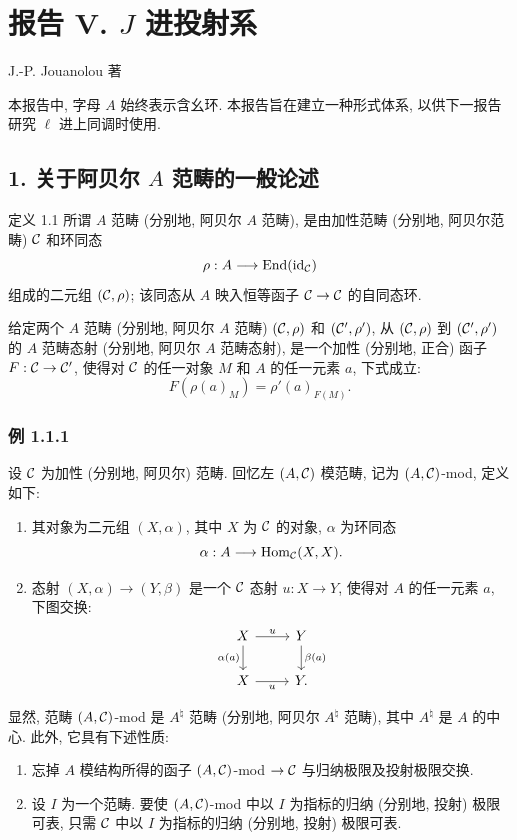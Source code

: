 
\section*{报告 V. $J$ 进投射系}
\begin{center}J.-P. Jouanolou 著\end{center}

本报告中, 字母 $A$ 始终表示含幺环. 本报告旨在建立一种形式体系, 以供下一报告研究 $\ell$ 进上同调时使用.

\subsection*{1. 关于阿贝尔 $A$ 范畴的一般论述}

\begin{statement}{定义 1.1}
所谓 $A$ 范畴 (分别地, 阿贝尔 $A$ 范畴), 是由加性范畴 (分别地, 阿贝尔范畴) $\mathcal C$ 和环同态
\[
\rho:A\longrightarrow \operatorname{End}(\operatorname{id}_{\mathcal C})
\]
组成的二元组 $(\mathcal C,\rho)$; 该同态从 $A$ 映入恒等函子 $\mathcal C\to\mathcal C$ 的自同态环.
\end{statement}

给定两个 $A$ 范畴 (分别地, 阿贝尔 $A$ 范畴) $(\mathcal C,\rho)$ 和 $(\mathcal C',\rho')$, 从 $(\mathcal C,\rho)$ 到 $(\mathcal C',\rho')$ 的 $A$ 范畴态射 (分别地, 阿贝尔 $A$ 范畴态射), 是一个加性 (分别地, 正合) 函子 $F:\mathcal C\to\mathcal C'$, 使得对 $\mathcal C$ 的任一对象 $M$ 和 $A$ 的任一元素 $a$, 下式成立:
\[
F(\rho(a)_M)=\rho'(a)_{F(M)}.
\]

\subsubsection*{例 1.1.1}
设 $\mathcal C$ 为加性 (分别地, 阿贝尔) 范畴. 回忆左 $(A,\mathcal C)$ 模范畴, 记为 $(A,\mathcal C)$-mod, 定义如下:
\begin{enumerate}[label=(\roman*)]
\item 其对象为二元组 $(X,\alpha)$, 其中 $X$ 为 $\mathcal C$ 的对象, $\alpha$ 为环同态
\[
\alpha:A\longrightarrow \operatorname{Hom}_{\mathcal C}(X,X).
\]
\item 态射 $(X,\alpha)\to(Y,\beta)$ 是一个 $\mathcal C$ 态射 $u:X\to Y$, 使得对 $A$ 的任一元素 $a$, 下图交换:
\[
\begin{tikzcd}
X \arrow[r,"u"] \arrow[d,"\alpha(a)"'] & Y \arrow[d,"\beta(a)"]\\
X \arrow[r,"u"'] & Y .
\end{tikzcd}
\]
\end{enumerate}
显然, 范畴 $(A,\mathcal C)$-mod 是 $A^{\natural}$ 范畴 (分别地, 阿贝尔 $A^{\natural}$ 范畴), 其中 $A^{\natural}$ 是 $A$ 的中心. 此外, 它具有下述性质:
\begin{enumerate}[label=(\alph*)]
\item 忘掉 $A$ 模结构所得的函子 $(A,\mathcal C)$-mod $\to\mathcal C$ 与归纳极限及投射极限交换.
\item 设 $I$ 为一个范畴. 要使 $(A,\mathcal C)$-mod 中以 $I$ 为指标的归纳 (分别地, 投射) 极限可表, 只需 $\mathcal C$ 中以 $I$ 为指标的归纳 (分别地, 投射) 极限可表.
\end{enumerate}

